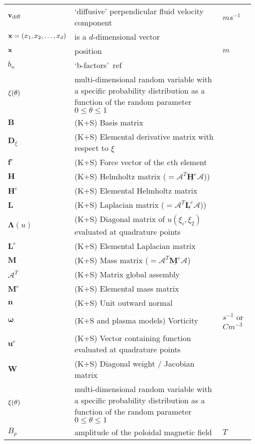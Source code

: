 \begin{longtable}{|p{3.0cm}|p{10.0cm}|p{3.0cm}|}
${\bf v}_\textrm{diff}$ & `diffusive' perpendicular fluid velocity component  &  $m s^{-1}$ \\
${\bf x}=\left(x_1,x_2,\dots,x_d\right)$ & is a $d$-dimensional vector  & \\
${\bf x}$ & position  &  $m$ \\
$b_n$ & `b-factors'~ref~\cite[slide 21]{omullane} & \\
${\boldmath \xi}(\theta)$ & multi-dimensional random variable with a specific probability distribution as a function of the random parameter~$0\leq\theta\leq 1$ & \\
$\boldsymbol{B}$ &  (K+S) Basis matrix & \\
$\boldsymbol{D}_{\xi}$ &  (K+S) Elemental derivative matrix with respect to $\xi$ & \\
$\boldsymbol{f}^e$ &  (K+S) Force vector of the $e$th element & \\
$\boldsymbol{H}$ &  (K+S) Helmholtz matrix ($=\mathcal{A}^T \underline{\boldsymbol{H}^e} \mathcal{A}$)) & \\
$\boldsymbol{H}^e$ &  (K+S) Elemental Helmholtz matrix & \\
$\boldsymbol{L}$ &  (K+S) Laplacian matrix ($=\mathcal{A}^T \underline{\boldsymbol{L}^e} \mathcal{A}$)) & \\
$\boldsymbol{\Lambda}(u)$ &  (K+S) Diagonal matrix of $u(\xi_i, \xi_2)$ evaluated at quadrature points & \\
$\boldsymbol{L}^e$ &  (K+S) Elemental Laplacian matrix & \\
$\boldsymbol{M}$ &  (K+S) Mass matrix ($=\mathcal{A}^T \underline{\boldsymbol{M}^e} \mathcal{A}$) & \\
$\boldsymbol{\mathcal{A}}^T$ &  (K+S) Matrix global assembly & \\
$\boldsymbol{M}^e$ &  (K+S) Elemental mass matrix & \\
$\boldsymbol{n}$ &  (K+S) Unit outward normal & \\
$\boldsymbol{\omega}$ &  (K+S and plasma models) Vorticity & $s^{-1}$ or $C m^{-3}$\\
$\boldsymbol{u}^e$ &  (K+S) Vector containing function evaluated at quadrature points & \\
$\boldsymbol{W}$ &  (K+S) Diagonal weight / Jacobian matrix & \\
${\boldmath \xi}(\theta)$ & multi-dimensional random variable with a specific probability distribution as a function of the random parameter~$0\leq\theta\leq 1$ & \\
$B_p$ & amplitude of the poloidal magnetic field  &  $T$  \\

\end{longtable}
